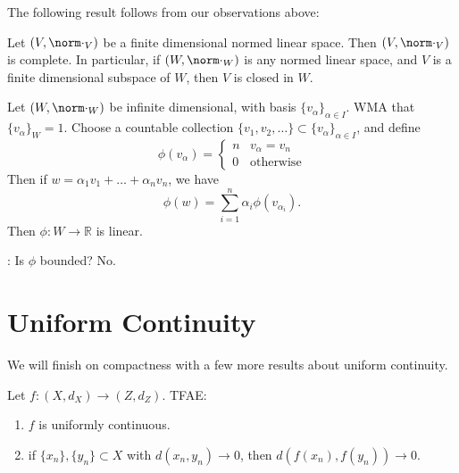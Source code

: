 \documentclass[notoc,notitlepage]{tufte-book}
\begin{document}
The following result follows from our observations above:

\begin{thm}\label{thm:completeness_of_finite_dimensional_normed_linear_spaces}
  Let $(V, \norm\cdot_V)$ be a finite dimensional normed linear space. Then $(V, \norm\cdot_V)$ is complete. In particular, if $(W, \norm\cdot_W)$ is any normed linear space, and $V$ is a finite dimensional subspace of $W$, then $V$ is closed in $W$.
\end{thm}

\begin{eg}
  Let $(W, \norm\cdot_W)$ be infinite dimensional, with basis $\{ v_\alpha \}_{\alpha \in I}$. WMA that $\{ v_\alpha \}_W = 1$. Choose a countable collection $\{ v_1, v_2, \ldots \} \subset \{ v_\alpha \}_{\alpha \in I}$, and define
  \begin{equation*}
    \phi(v_\alpha) = \begin{cases}
      n & v_\alpha = v_n \\
      0 & \text{otherwise}
    \end{cases}
  \end{equation*}
  Then if $w = \alpha_1 v_1 + \hdots + \alpha_n v_n$, we have
  \begin{equation*}
    \phi(w) = \sum_{i=1}^{n} \alpha_i \phi(v_{\alpha_i}).
  \end{equation*}
  Then $\phi : W \to \mathbb{R}$ is linear.
\end{eg}

: Is $\phi$ bounded? No.


\section{Uniform Continuity}%
\label{sec:uniform_continuity}

We will finish on compactness with a few more results about uniform continuity.

\begin{thm}\label{thm:sequential_characterization_of_uniform_continuity}
  Let $f : (X, d_X) \to (Z, d_Z)$. TFAE:
  \begin{enumerate}
    \item $f$ is uniformly continuous.
    \item if $\{ x_n \}, \{ y_n \} \subset X$ with $d(x_n, y_n) \to 0$, then $d(f(x_n), f(y_n)) \to 0$.
  \end{enumerate}
\end{thm}
\end{document}
